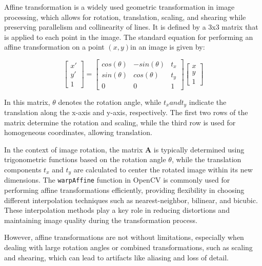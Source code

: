 \documentclass[conference]{IEEEtran}
\begin{document}
Affine transformation is a widely used geometric transformation in image processing, which allows for rotation, translation, scaling, and shearing while preserving parallelism and collinearity of lines. It is defined by a 3x3 matrix that is applied to each point in the image. 
The standard equation for performing an affine transformation on a point \((x,y)\)in an image is given by:

$$
\begin{bmatrix}
x' \\
y' \\
1
\end{bmatrix}
=
\begin{bmatrix}
cos(\theta) & -sin(\theta) & t_x \\
sin(\theta) & cos(\theta) & t_y \\
0 & 0 & 1
\end{bmatrix}
\begin{bmatrix}
x \\
y \\
1
\end{bmatrix}
$$

In this matrix, $\theta$ denotes the rotation angle, while \( t_x and t_y \) indicate the translation along the x-axis and y-axis, respectively. The first two rows of the matrix determine the rotation and scaling, while the third row is used for homogeneous coordinates, allowing translation.

In the context of image rotation, the matrix $\mathbf{A}$ is typically determined using trigonometric functions based on the rotation angle $\theta$, while the translation components $t_x$ and $t_y$ are calculated to center the rotated image within its new dimensions.
The \texttt{warpAffine} function in OpenCV is commonly used for performing affine transformations efficiently, providing flexibility in choosing different interpolation techniques such as nearest-neighbor, bilinear, and bicubic. These interpolation methods play a key role in reducing distortions and maintaining image quality during the transformation process\cite{wang2021panoramic}.

However, affine transformations are not without limitations, especially when dealing with large rotation angles or combined transformations, such as scaling and shearing, which can lead to artifacts like aliasing and loss of detail. 
\end{document}
